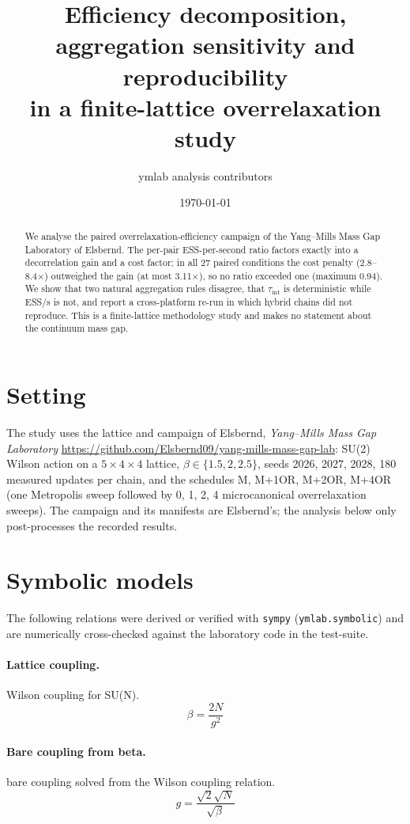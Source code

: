 \documentclass[11pt]{article}
\title{Efficiency decomposition, aggregation sensitivity and reproducibility\\
in a finite-lattice overrelaxation study}
\author{ymlab analysis contributors}
\date{\today}
\begin{document}
\maketitle
\begin{abstract}
We analyse the paired overrelaxation-efficiency campaign of the Yang--Mills Mass Gap
Laboratory of Elsbernd. The per-pair ESS-per-second ratio factors exactly into a
decorrelation gain and a cost factor; in all 27 paired conditions the cost
penalty (2.8--8.4$\times$) outweighed the gain
(at most 3.11$\times$), so no ratio exceeded one (maximum 0.94).
We show that two natural aggregation rules disagree, that $\tau_{\mathrm{int}}$ is deterministic while
ESS/s is not, and report a cross-platform re-run in which hybrid chains did not reproduce.
This is a finite-lattice methodology study and makes no statement about the continuum mass gap.
\end{abstract}

\section{Setting}
The study uses the lattice and campaign of Elsbernd, \emph{Yang--Mills Mass Gap Laboratory} \url{https://github.com/Elsbernd09/yang-mills-mass-gap-lab}: SU(2) Wilson action on a
$5\times4\times4$ lattice, $\beta\in\{1.5, 2, 2.5\}$,
seeds 2026, 2027, 2028, 180 measured updates per chain, and the
schedules M, M+1OR, M+2OR, M+4OR (one Metropolis sweep followed by 0, 1, 2, 4 microcanonical overrelaxation sweeps).
The campaign and its manifests are Elsbernd's; the analysis below only post-processes
the recorded results.

\section{Symbolic models}
The following relations were derived or verified with \texttt{sympy} (\texttt{ymlab.symbolic}) and are
numerically cross-checked against the laboratory code in the test-suite.
\paragraph{Lattice coupling.} Wilson coupling for SU(N).
\begin{equation}
  \beta = \frac{2 N}{g^{2}}
\end{equation}
\paragraph{Bare coupling from beta.} bare coupling solved from the Wilson coupling relation.
\begin{equation}
  g = \frac{\sqrt{2} \sqrt{N}}{\sqrt{\beta}}
\end{equation}
\end{document}
